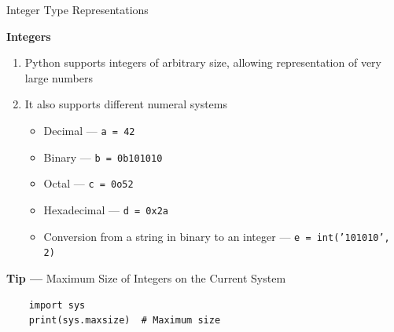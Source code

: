 \documentclass[
	11pt, 
]{beamer}
\begin{document}

\begin{frame}[fragile]{Integer Type Representations} %

\begin{block}{\textbf{Integers}}
\begin{enumerate}
    \item Python supports integers of arbitrary size, allowing representation of very large numbers 

    \item It also supports different numeral systems
    \vspace{.1cm}
    \begin{itemize}
        \item Decimal --- \texttt{a = 42}
        \item Binary ---  \texttt{b = 0b101010}
        \item Octal ---  \texttt{c = 0o52}
        \item Hexadecimal ---  \texttt{d = 0x2a}
        \item Conversion from a string in binary to an integer --- \texttt{e = int('101010', 2)}
    \end{itemize}

\end{enumerate}
\end{block}


\begin{exampleblock}{\textbf{Tip ---} Maximum Size of Integers on the Current System}
\vspace{.05cm}
    \begin{verbatim}
    import sys
    print(sys.maxsize)  # Maximum size
    \end{verbatim}
\end{exampleblock}

\end{frame}


\end{document}
